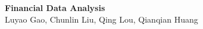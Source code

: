 \documentclass[12pt]{article}
\begin{document}
\begin{center}
{\bf \large Financial Data Analysis }
\\{    }
Luyao Gao, Chunlin Liu, Qing Lou, Qianqian Huang
\end{center}
\end{document}
